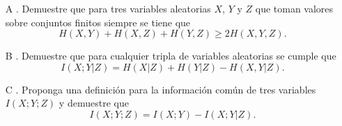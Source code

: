 \begin{enumerate}
    \item[A]. Demuestre que para tres variables aleatorias $X$, $Y$ y $Z$ que toman valores sobre conjuntos finitos siempre se tiene que 
    \[
    H(X, Y) + H(X, Z) + H(Y, Z) \geq 2H(X, Y, Z).
    \]
    \item[B]. Demuestre que para cualquier tripla de variables aleatorias se cumple que 
    \[
    I(X; Y | Z) = H(X | Z) + H(Y | Z) - H(X, Y | Z).
    \]
    \item[C]. Proponga una definición para la información común de tres variables $I(X; Y; Z)$ y demuestre que 
    \[
    I(X; Y; Z) = I(X; Y) - I(X; Y | Z).
    \]
\end{enumerate}
